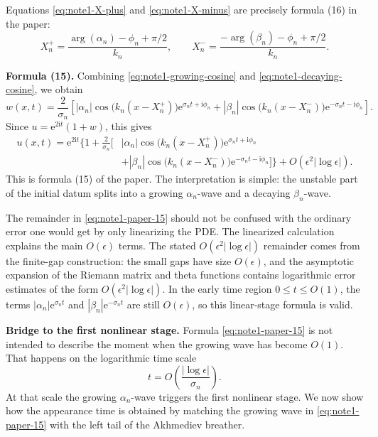 \documentclass{amsart}
\newcounter{note}
\numberwithin{equation}{hw}
\newcommand{\noteheading}[1]{\vspace{1em}\noindent\textbf{#1}}
\begin{document}
Equations \eqref{eq:note1-X-plus} and \eqref{eq:note1-X-minus} are precisely
formula (16) in the paper:
\begin{equation}
X_n^+
=
\frac{\arg(\alpha_n)-\phi_n+\pi/2}{k_n},
\qquad
X_n^-
=
\frac{-\arg(\beta_n)-\phi_n+\pi/2}{k_n}.
\label{eq:note1-paper-16}
\end{equation}

\noteheading{Formula (15).}
Combining \eqref{eq:note1-growing-cosine} and
\eqref{eq:note1-decaying-cosine}, we obtain
\begin{equation}
w(x,t)
=
\frac{2}{\sigma_n}
\left[
|\alpha_n|
\cos\bigl(k_n(x-X_n^+)\bigr)
\mathrm{e}^{\sigma_nt+\mathrm{i}\phi_n}
+
|\beta_n|
\cos\bigl(k_n(x-X_n^-)\bigr)
\mathrm{e}^{-\sigma_nt-\mathrm{i}\phi_n}
\right].
\label{eq:note1-w-formula-15}
\end{equation}
Since \(u=\mathrm{e}^{2\mathrm{i}t}(1+w)\), this gives
\begin{align}
u(x,t)
=
\mathrm{e}^{2\mathrm{i}t}
\Bigg\{
1
+
\frac{2}{\sigma_n}
\bigg[
&|\alpha_n|
\cos\bigl(k_n(x-X_n^+)\bigr)
\mathrm{e}^{\sigma_nt+\mathrm{i}\phi_n}
\nonumber\\
&+
|\beta_n|
\cos\bigl(k_n(x-X_n^-)\bigr)
\mathrm{e}^{-\sigma_nt-\mathrm{i}\phi_n}
\bigg]
\Bigg\}
+
O\!\left(\epsilon^2|\log\epsilon|\right).
\label{eq:note1-paper-15}
\end{align}
This is formula (15) of the paper.  The interpretation is simple:
the unstable part of the initial datum splits into a growing
\(\alpha_n\)-wave and a decaying \(\beta_n\)-wave.

The remainder in \eqref{eq:note1-paper-15} should not be confused with the
ordinary error one would get by only linearizing the PDE.  The linearized
calculation explains the main \(O(\epsilon)\) terms.  The stated
\(O(\epsilon^2|\log\epsilon|)\) remainder comes from the finite-gap
construction: the small gaps have size \(O(\epsilon)\), and the asymptotic
expansion of the Riemann matrix and theta functions contains logarithmic
error estimates of the form \(O(\epsilon^2|\log\epsilon|)\).  In the early
time region \(0\le t\le O(1)\), the terms
\(|\alpha_n|\mathrm{e}^{\sigma_nt}\) and
\(|\beta_n|\mathrm{e}^{-\sigma_nt}\) are still \(O(\epsilon)\), so this
linear-stage formula is valid.

\noteheading{Bridge to the first nonlinear stage.}
Formula \eqref{eq:note1-paper-15} is not intended to describe the moment
when the growing wave has become \(O(1)\).  That happens on the logarithmic
time scale
\begin{equation}
t=O\left(\frac{|\log\epsilon|}{\sigma_n}\right).
\label{eq:note1-log-time-scale}
\end{equation}
At that scale the growing \(\alpha_n\)-wave triggers the first nonlinear
stage.  We now show how the appearance time is obtained by matching the
growing wave in \eqref{eq:note1-paper-15} with the left tail of the
Akhmediev breather.
\end{document}

